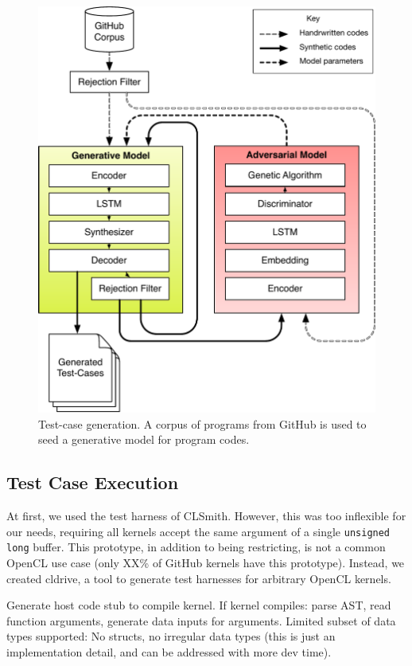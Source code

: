 \begin{figure}
  \centering
  \includegraphics[width=.95\columnwidth]{img/clgen} %
  \caption{%
    Test-case generation. A corpus of programs from GitHub is used to seed a generative model for program codes.%
  }%
  \label{fig:deeptune}
\end{figure}

\subsection{Test Case Execution}

At first, we used the test harness of CLSmith. However, this was too inflexible for our needs, requiring all kernels accept the same argument of a single \texttt{unsigned long} buffer. This prototype, in addition to being restricting, is not a common OpenCL use case (only XX\% of GitHub kernels have this prototype). Instead, we created cldrive, a tool to generate test harnesses for arbitrary OpenCL kernels.

Generate host code stub to compile kernel. If kernel compiles: parse AST, read function arguments, generate data inputs for arguments. Limited subset of data types supported: No structs, no irregular data types (this is just an implementation detail, and can be addressed with more dev time).
